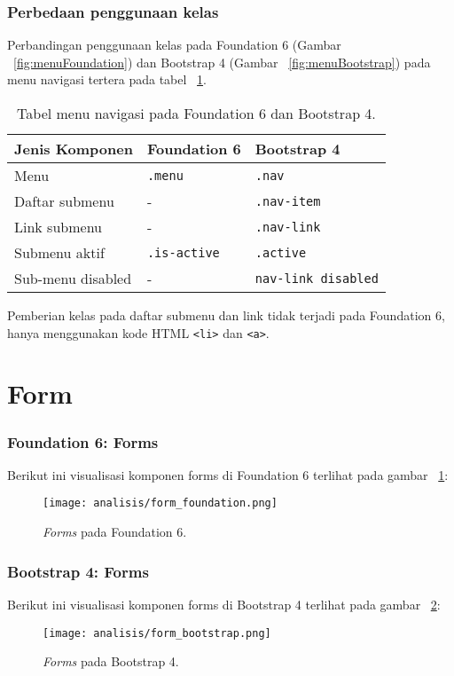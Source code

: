 \subsubsection{Perbedaan penggunaan kelas}
\noindent Perbandingan penggunaan kelas pada Foundation 6 (Gambar ~\ref{fig:menuFoundation}) dan Bootstrap 4 (Gambar ~\ref{fig:menuBootstrap}) pada menu navigasi tertera pada tabel ~\ref{table:konversiNavigasi}.\\
\begin{table}[H]
	\caption{Tabel menu navigasi pada Foundation 6 dan Bootstrap 4.}
	\begin{tabular}{| p{} | p{} | p{} |} 
		\hline
		\textbf{Jenis Komponen} & \textbf{Foundation 6} & \textbf{Bootstrap 4}  \\ [0.5ex] 
		\hline	
		Menu &\texttt{.menu} & \texttt{.nav } \\
		\hline	
		Daftar submenu & - & \texttt{.nav-item} \\
		\hline
		Link submenu & - & \texttt{.nav-link} \\
		\hline
		Submenu aktif & \texttt{.is-active} & \texttt{.active}  \\
		\hline
		Sub-menu disabled & - & \texttt{nav-link disabled}  \\[1ex] 
		\hline
	\end{tabular}
	\label{table:konversiNavigasi}
\end{table}
Pemberian kelas pada daftar submenu dan link tidak terjadi pada Foundation 6, hanya menggunakan kode HTML \texttt{<li>} dan \texttt{<a>}.

\section{Form}
\subsubsection{Foundation 6: Forms}
Berikut ini visualisasi komponen forms di Foundation 6 terlihat pada gambar ~\ref{fig:formFoundation}:
\begin{figure} [H]
	\centering  
	\texttt{[image: analisis/form\_foundation.png]}  
	\caption{\textit{Forms} pada Foundation 6.}
	\label{fig:formFoundation}	 
\end{figure}


\subsubsection{Bootstrap 4: Forms}
Berikut ini visualisasi komponen forms di Bootstrap 4 terlihat pada gambar ~\ref{fig:formBootstrap}:
\begin{figure} [H]
	\centering  
	\texttt{[image: analisis/form\_bootstrap.png]}  
	\caption{\textit{Forms} pada Bootstrap 4.}
	\label{fig:formBootstrap}	 
\end{figure}

